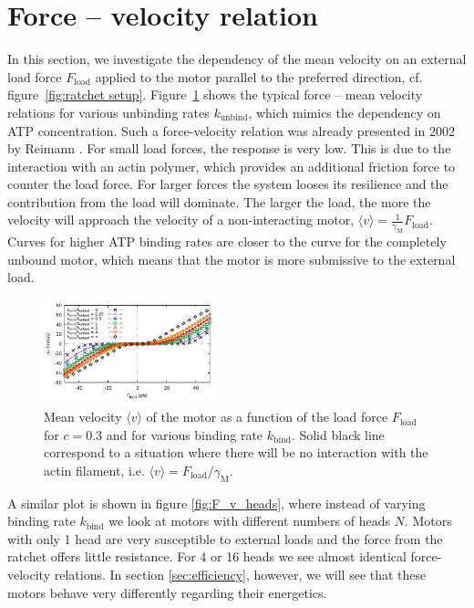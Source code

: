 \documentclass[aps,pre,twocolumn,showpacs,showkeys,superscriptaddress,floatfix]{revtex4-1}
\begin{document}
\section{Force -- velocity relation}
\label{sec:force-velocity}
In this section, we investigate the dependency of the mean velocity on an external load force $F_\text{load}$ applied to the motor parallel to the preferred direction, 
cf. figure~\ref{fig:ratchet setup}.
Figure~\ref{fig:F_v} shows the typical force -- mean velocity relations for various unbinding rates $k_\text{unbind}$, which mimics the dependency on ATP concentration.
Such a force-velocity relation was already presented in 2002 by Reimann \cite{reimann2002brownian}.
For small load forces, the response is very low. 
This is due to the interaction with an actin polymer, which provides an additional friction force to counter the load force. 
For larger forces the system looses its resilience and the contribution from the load will dominate. 
The larger the load, the more the velocity will approach the velocity of a non-interacting motor, $\langle v \rangle = \frac{1}{\gamma_\text{M}}F_\text{load}$.
Curves for higher ATP binding rates are closer to the curve for the completely unbound motor,
which means that the motor is more submissive to the external load.
\begin{figure}[t]
\centering
\includegraphics[width=0.45\textwidth,height=!]{F_v}
\caption{
\label{fig:F_v} 
Mean velocity $\langle v \rangle$ of the motor as a function of the load force $F_\text{load}$ for $c=0.3$ and for various binding rate $k_\text{bind}$.
Solid black line correspond to a situation where there will be no interaction with the actin filament, i.e. $\langle v \rangle = F_\text{load} / \gamma_\text{M}$. 
}
\end{figure}

A similar plot is shown in figure \ref{fig:F_v_heads}, where instead of varying binding rate $k_\text{bind}$ we look at motors with different numbers of heads $N$. Motors with only 1 head are very susceptible to external loads and the force from the ratchet offers little resistance. For 4 or 16 heads we see almost identical force-velocity relations. In section \ref{sec:efficiency}, however, we will see that these motors behave very differently regarding their energetics. 
\end{document}
